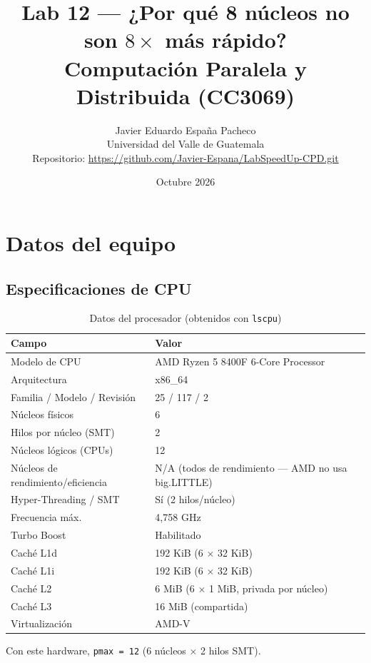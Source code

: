 \documentclass[12pt,letterpaper]{article}
\title{\textbf{Lab 12 — ¿Por qué 8 núcleos no son $8\times$ más rápido?}\\
       \large Computación Paralela y Distribuida (CC3069)}
\author{Javier Eduardo España Pacheco\\
        \small Universidad del Valle de Guatemala\\[4pt]
        Repositorio: \url{https://github.com/Javier-Espana/LabSpeedUp-CPD.git}}
\date{Octubre 2026}
\begin{document}
\maketitle
\tableofcontents
\newpage

\section{Datos del equipo}

\subsection{Especificaciones de CPU}

\begin{table}[H]
\centering
\caption{Datos del procesador (obtenidos con \texttt{lscpu})}
\begin{tabularx}{\textwidth}{lX}
\toprule
\textbf{Campo} & \textbf{Valor} \\
\midrule
Modelo de CPU & AMD Ryzen 5 8400F 6-Core Processor \\
Arquitectura & x86\_64 \\
Familia / Modelo / Revisión & 25 / 117 / 2 \\
Núcleos físicos & 6 \\
Hilos por núcleo (SMT) & 2 \\
Núcleos lógicos (CPUs) & 12 \\
Núcleos de rendimiento/eficiencia & N/A (todos de rendimiento — AMD no usa big.LITTLE) \\
Hyper-Threading / SMT & Sí (2 hilos/núcleo) \\
Frecuencia máx. & 4{,}758 GHz \\
Turbo Boost & Habilitado \\
Caché L1d & 192 KiB (6 $\times$ 32 KiB) \\
Caché L1i & 192 KiB (6 $\times$ 32 KiB) \\
Caché L2 & 6 MiB (6 $\times$ 1 MiB, privada por núcleo) \\
Caché L3 & 16 MiB (compartida) \\
Virtualización & AMD-V \\
\bottomrule
\end{tabularx}
\end{table}

Con este hardware, \texttt{pmax = 12} (6 núcleos × 2 hilos SMT).
\end{document}
